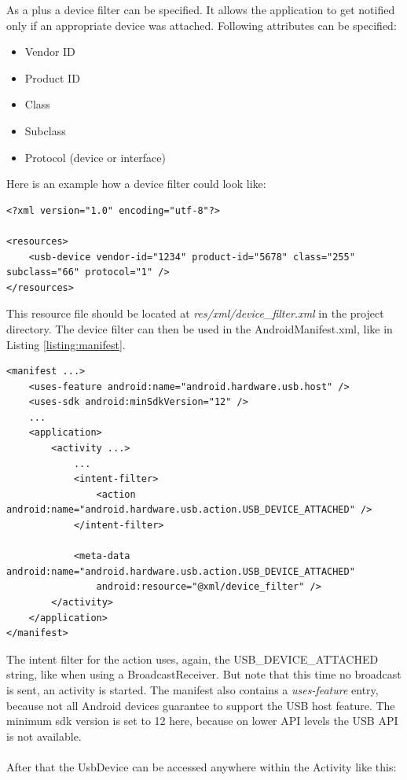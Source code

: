 As a plus a device filter can be specified. It allows the application to get notified only if an appropriate device was attached. Following attributes can be specified\cite{android_usb_host}:

\begin{itemize}
\item Vendor ID
\item Product ID
\item Class
\item Subclass
\item Protocol (device or interface)
\end{itemize}

Here is an example how a device filter could look like:

\lstset{language=XML}
\begin{lstlisting}[caption=Example device filter \cite{android_usb_host}, label=listing:device_filter]
<?xml version="1.0" encoding="utf-8"?>

<resources>
    <usb-device vendor-id="1234" product-id="5678" class="255" subclass="66" protocol="1" />
</resources>
\end{lstlisting}

This resource file should be located at \textit{res/xml/device\_filter.xml} in the project directory\cite{android_usb_host}. The device filter can then be used in the AndroidManifest.xml, like in Listing \ref{listing:manifest}.

\begin{lstlisting}[caption=AndroidManifest.xml \cite{android_usb_host}, label=listing:manifest]
<manifest ...>
    <uses-feature android:name="android.hardware.usb.host" />
    <uses-sdk android:minSdkVersion="12" />
    ...
    <application>
        <activity ...>
            ...
            <intent-filter>
                <action android:name="android.hardware.usb.action.USB_DEVICE_ATTACHED" />
            </intent-filter>

            <meta-data android:name="android.hardware.usb.action.USB_DEVICE_ATTACHED"
                android:resource="@xml/device_filter" />
        </activity>
    </application>
</manifest>
\end{lstlisting}

The intent filter for the action uses, again, the USB\_DEVICE\_ATTACHED string, like when using a BroadcastReceiver. But note that this time no broadcast is sent, an activity is started. The manifest also contains a \textit{uses-feature} entry, because not all Android devices guarantee to support the USB host feature\cite{android_usb_host}. The minimum sdk version is set to 12 here, because on lower API levels the USB API is not available. \\\\
After that the UsbDevice can be accessed anywhere within the Activity like this:

